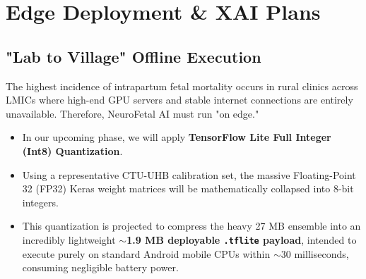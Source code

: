 \documentclass[12pt,a4paper]{report}
\begin{document}
\begin{table}[H]
\centering
\caption{Baseline Performance Matrix vs. Proposed Target}
\label{tab:baselines}
\renewcommand{\arraystretch}{1.3}
\end{table}

\chapter{Edge Deployment \& XAI Plans}
\section{"Lab to Village" Offline Execution}
The highest incidence of intrapartum fetal mortality occurs in rural clinics across LMICs where high-end GPU servers and stable internet connections are entirely unavailable. Therefore, NeuroFetal AI must run "on edge."
\begin{itemize}
    \item In our upcoming phase, we will apply \textbf{TensorFlow Lite Full Integer (Int8) Quantization}.
    \item Using a representative CTU-UHB calibration set, the massive Floating-Point 32 (FP32) Keras weight matrices will be mathematically collapsed into 8-bit integers.
    \item This quantization is projected to compress the heavy 27 MB ensemble into an incredibly lightweight \textbf{$\sim$1.9 MB deployable \texttt{.tflite} payload}, intended to execute purely on standard Android mobile CPUs within $\sim$30 milliseconds, consuming negligible battery power.
\end{itemize}
\end{document}
